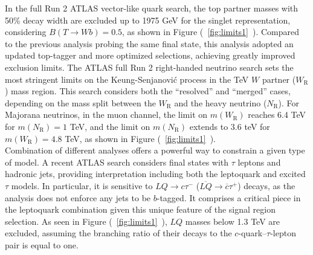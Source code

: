 \documentclass{moriond}
\begin{document}
In the full Run 2 ATLAS vector-like quark search, the top partner masses with
50\% decay width are excluded up to 1975 GeV for the singlet representation,
considering $B(T\rightarrow Wb)=0.5$, as shown in
Figure (~\ref{fig:limits1}~). Compared to the previous analysis
probing the same final state, this analysis adopted an updated top-tagger and
more optimized selections, achieving greatly improved exclusion limits. The
ATLAS full Run 2 right-handed neutrino search sets the most stringent limits on
the Keung-Senjanović process in the TeV $W$ partner ($W_{\mathrm{R}}$) mass
region. This search considers both the ``resolved'' and ``merged'' cases,
depending on the mass split between the $W_{\mathrm{R}}$ and the heavy neutrino
($N_{\mathrm{R}}$). For Majorana neutrinos, in the muon channel, the limit on
$m(W_{\mathrm{R}})$ reaches 6.4 TeV for $m(N_{\mathrm{R}})=1$ TeV, and the
limit on $m(N_{\mathrm{R}})$ extends to 3.6 teV for $m(W_{\mathrm{R}})=4.8$
TeV, as shown in Figure (~\ref{fig:limits1}~).\\           

Combination of different analyses offers a powerful way to constrain a given
type of model. A recent ATLAS search considers final states with $\tau$ leptons
and hadronic jets, providing interpretation including both the leptoquark and
excited $\tau$ models. In particular, it is sensitive to $LQ\rightarrow
c\tau^{-}$ ($\overline{LQ}\rightarrow\overline{c}\tau^{+}$) decays, as the
analysis does not enforce any jets to be $b$-tagged. It comprises a critical
piece in the leptoquark combination given this unique feature of the signal
region selection. As seen in Figure (~\ref{fig:limits1}~),
$LQ$ masses below 1.3 TeV are excluded, assuming the branching ratio of their
decays to the $c$-quark–$\tau$-lepton pair is equal to one.\\   

\clearpage
\end{document}
